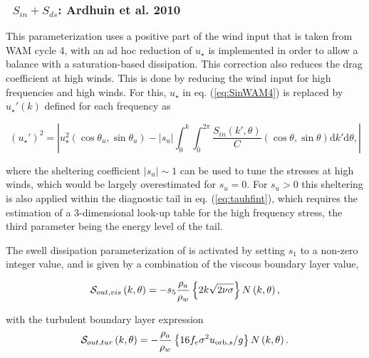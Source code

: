 \vsssub
\subsubsection{~$S_{in} + S_{ds}$: Ardhuin et al. 2010} \label{sec:ST4}
\vsssub


\noindent 
This parameterization uses a positive part of the wind input that is taken
from WAM cycle 4, with an ad hoc reduction of $u_\star$ is implemented in
order to allow a balance with a saturation-based dissipation.  This correction
also reduces the drag coefficient at high winds. This is done by reducing the
wind input for high frequencies and high winds. For this, $u_\star$ in
eq. (\ref{eq:SinWAM4}) is replaced by $u_\star '(k)$ defined for each
frequency as

\begin{equation}
\left(u_\star '\right)^2=\left|u_\star^2 \left(\cos \theta_u, \sin
\theta_u \right) - \left|s_u\right| \int_0^k \int_0^{2 \pi}
\frac{S_{in}\left(k',\theta \right)}{C}  \left(\cos \theta, \sin
\theta \right)  {\mathrm d} k' \mathrm d
\theta,\label{ustarp}\right|
\end{equation}

\noindent 
where the sheltering coefficient $\left|s_u\right|\sim 1$ can be used to tune
the stresses at high winds, which would be largely overestimated for
$s_u=0$. For $s_u > 0$ this sheltering is also applied within the diagnostic
tail in eq. (\ref{eq:tauhfint}), which requires the estimation of a
3-dimensional look-up table for the high frequency stress, the third parameter
being the energy level of the tail.

The swell dissipation parameterization of \cite{art:ACC09} is activated by
setting $s_1$ to a non-zero integer value, and is given by a combination of
the viscous boundary layer value,

\begin{equation}
{\cal S}_{out,vis}\left(k,\theta\right) = - s_5 \frac{\rho_a}{\rho_w}\left\{ 2 k \sqrt{2
\nu \sigma}\right\}  N \left(k,\theta\right) \label{Sds_turb},\label{eq:Dore}
\end{equation}

\noindent
with the turbulent boundary layer expression 
\begin{equation}
{\cal S}_{out,tur} \left(k,\theta\right) = - \frac{\rho_a}{\rho_w}\left\{  16 f_e
\sigma^2 u_{\mathrm{orb},s} / g \right\}
 N\left(k,\theta\right) \label{Sds_visc}.\label{eq:swell_turb}
\end{equation}

